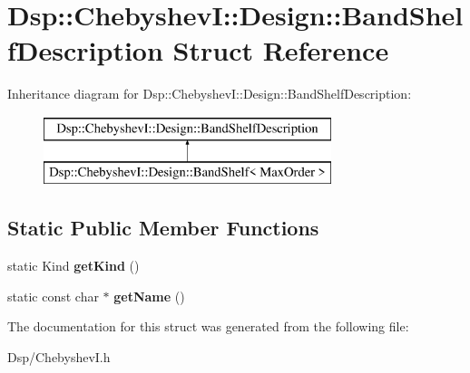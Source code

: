 \hypertarget{structDsp_1_1ChebyshevI_1_1Design_1_1BandShelfDescription}{\section{Dsp\-:\-:Chebyshev\-I\-:\-:Design\-:\-:Band\-Shelf\-Description Struct Reference}
\label{structDsp_1_1ChebyshevI_1_1Design_1_1BandShelfDescription}
}
Inheritance diagram for Dsp\-:\-:Chebyshev\-I\-:\-:Design\-:\-:Band\-Shelf\-Description\-:\begin{figure}[H]
\begin{center}
\leavevmode
\includegraphics[height=2.000000cm]{structDsp_1_1ChebyshevI_1_1Design_1_1BandShelfDescription}
\end{center}
\end{figure}
\subsection*{Static Public Member Functions}
\begin{DoxyCompactItemize}
\item 
\hypertarget{structDsp_1_1ChebyshevI_1_1Design_1_1BandShelfDescription_ac7ca28a0ccac5ca9c8b825056418b02c}{static Kind {\bfseries get\-Kind} ()}\label{structDsp_1_1ChebyshevI_1_1Design_1_1BandShelfDescription_ac7ca28a0ccac5ca9c8b825056418b02c}

\item 
\hypertarget{structDsp_1_1ChebyshevI_1_1Design_1_1BandShelfDescription_a79b23858e1c7d1b8335de6c355a342b9}{static const char $\ast$ {\bfseries get\-Name} ()}\label{structDsp_1_1ChebyshevI_1_1Design_1_1BandShelfDescription_a79b23858e1c7d1b8335de6c355a342b9}

\end{DoxyCompactItemize}


The documentation for this struct was generated from the following file\-:\begin{DoxyCompactItemize}
\item 
Dsp/Chebyshev\-I.\-h\end{DoxyCompactItemize}
